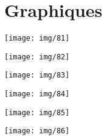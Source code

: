 \documentclass[a4paper, 12pt, twoside,openright]{report}
\begin{document}
\part{Graphiques}

\begin{landscape} 		
	\texttt{[image: img/81]}
\end{landscape}
\begin{landscape} 		
	\texttt{[image: img/82]}
\end{landscape}
\begin{landscape} 		
	\texttt{[image: img/83]}
\end{landscape}
\begin{landscape} 		
	\texttt{[image: img/84]}
\end{landscape}
\begin{landscape} 		
	\texttt{[image: img/85]}
\end{landscape}
\begin{landscape} 		
	\texttt{[image: img/86]}
\end{landscape}
	\newpage
	\clearpage
  
	\clearpage
	\nopagebreak
 	
 	
\end{document}
